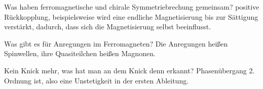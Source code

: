\begin{fquestion}{Was haben ferromagnetische und chirale Symmetriebrechung gemeinsam?}
positive Rückkopplung, beispielsweise wird eine endliche Magnetisierung bis zur Sättigung verstärkt, dadurch, dass sich die Magnetisierung selbst beeinflusst. 
\end{fquestion}

\begin{fquestion}{Was gibt es für Anregungen im Ferromagneten?}
    Die Anregungen heißen Spinwellen, ihre Quasiteilchen heißen Magnonen.
\end{fquestion}



\begin{fquestion}{Kein Knick mehr, was hat man an dem Knick denn erkannt?  }
    Phasenübergang 2. Ordnung ist, also eine Unstetigkeit in der ersten Ableitung. 
\end{fquestion}






